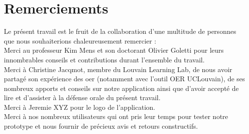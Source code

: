 \chapter*{Remerciements}

Le présent travail est le fruit de la collaboration d'une multitude de personnes que nous souhaiterions chaleureusement remercier : \\

Merci au professeur Kim Mens et son doctorant Olivier Goletti pour leurs innombrables conseils et contributions durant l'ensemble du travail. \\

Merci à Christine Jacqmot, membre du Louvain Learning Lab, de nous avoir partagé son expérience des \Gls{oer} (notamment avec l'outil OER UCLouvain), de ses nombreux apports et conseils sur notre application ainsi que d'avoir accepté de lire et d'assister à la défense orale du présent travail.\\

Merci à Jeremie XYZ pour le logo de l'application.\\

Merci à nos nombreux utilisateurs qui ont pris leur temps pour tester notre prototype et nous fournir de précieux avis et retours constructifs.

